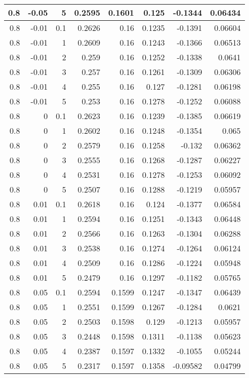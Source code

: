 \documentclass{amsart}
\theoremstyle{plain}
\numberwithin{equation}{section}
\begin{document}
\begin{longtable}{r | r | r | r | r | r | r | r}
0.8 & -0.05 & 5 & 0.2595 & 0.1601 & 0.125 & -0.1344 & 0.06434 \\ \hline
0.8 & -0.01 & 0.1 & 0.2626 & 0.16 & 0.1235 & -0.1391 & 0.06604 \\
0.8 & -0.01 & 1 & 0.2609 & 0.16 & 0.1243 & -0.1366 & 0.06513 \\
0.8 & -0.01 & 2 & 0.259 & 0.16 & 0.1252 & -0.1338 & 0.0641 \\
0.8 & -0.01 & 3 & 0.257 & 0.16 & 0.1261 & -0.1309 & 0.06306 \\
0.8 & -0.01 & 4 & 0.255 & 0.16 & 0.127 & -0.1281 & 0.06198 \\
0.8 & -0.01 & 5 & 0.253 & 0.16 & 0.1278 & -0.1252 & 0.06088 \\ \hline
0.8 & 0 & 0.1 & 0.2623 & 0.16 & 0.1239 & -0.1385 & 0.06619 \\
0.8 & 0 & 1 & 0.2602 & 0.16 & 0.1248 & -0.1354 & 0.065 \\
0.8 & 0 & 2 & 0.2579 & 0.16 & 0.1258 & -0.132 & 0.06362 \\
0.8 & 0 & 3 & 0.2555 & 0.16 & 0.1268 & -0.1287 & 0.06227 \\
0.8 & 0 & 4 & 0.2531 & 0.16 & 0.1278 & -0.1253 & 0.06092 \\
0.8 & 0 & 5 & 0.2507 & 0.16 & 0.1288 & -0.1219 & 0.05957 \\ \hline
0.8 & 0.01 & 0.1 & 0.2618 & 0.16 & 0.124 & -0.1377 & 0.06584 \\
0.8 & 0.01 & 1 & 0.2594 & 0.16 & 0.1251 & -0.1343 & 0.06448 \\
0.8 & 0.01 & 2 & 0.2566 & 0.16 & 0.1263 & -0.1304 & 0.06288 \\
0.8 & 0.01 & 3 & 0.2538 & 0.16 & 0.1274 & -0.1264 & 0.06124 \\
0.8 & 0.01 & 4 & 0.2509 & 0.16 & 0.1286 & -0.1224 & 0.05948 \\
0.8 & 0.01 & 5 & 0.2479 & 0.16 & 0.1297 & -0.1182 & 0.05765 \\ \hline
0.8 & 0.05 & 0.1 & 0.2594 & 0.1599 & 0.1247 & -0.1347 & 0.06439 \\
0.8 & 0.05 & 1 & 0.2551 & 0.1599 & 0.1267 & -0.1284 & 0.0621 \\
0.8 & 0.05 & 2 & 0.2503 & 0.1598 & 0.129 & -0.1213 & 0.05957 \\
0.8 & 0.05 & 3 & 0.2448 & 0.1598 & 0.1311 & -0.1138 & 0.05623 \\
0.8 & 0.05 & 4 & 0.2387 & 0.1597 & 0.1332 & -0.1055 & 0.05244 \\
0.8 & 0.05 & 5 & 0.2317 & 0.1597 & 0.1358 & -0.09582 & 0.04799 \\ \hline

\end{longtable}
\end{document}
